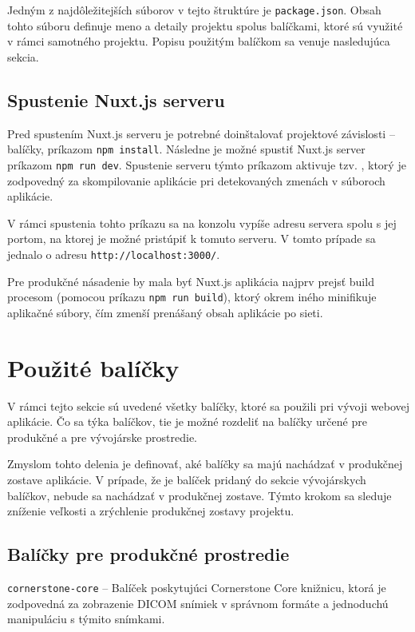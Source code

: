 Jedným z najdôležitejších súborov v tejto štruktúre je \texttt{package.json}. Obsah tohto súboru definuje meno a detaily projektu spolu\newline s balíčkami, ktoré sú využité v rámci samotného projektu. Popisu použitým balíčkom sa venuje nasledujúca sekcia.

\subsection {Spustenie Nuxt.js serveru}
Pred spustením Nuxt.js serveru je potrebné doinštalovať projektové závislosti -- balíčky, príkazom \texttt{npm install}. Následne je možné spustiť Nuxt.js server príkazom \texttt{npm run dev}. Spustenie serveru týmto príkazom aktivuje tzv. , ktorý je zodpovedný za skompilovanie aplikácie pri detekovaných zmenách v súboroch aplikácie.

\clearpage

V rámci spustenia tohto príkazu sa na konzolu vypíše adresu servera spolu s jej portom, na ktorej je možné pristúpiť k tomuto serveru. V tomto prípade sa jednalo o adresu \texttt{http://localhost:3000/}. 

Pre produkčné násadenie by mala byť Nuxt.js aplikácia najprv prejsť build procesom (pomocou príkazu \texttt{npm run build}), ktorý okrem iného minifikuje aplikačné súbory, čím zmenší prenášaný obsah aplikácie po sieti.

\section {Použité balíčky}
V rámci tejto sekcie sú uvedené všetky balíčky, ktoré sa použili pri vývoji webovej aplikácie.
Čo sa týka balíčkov, tie je možné rozdeliť na balíčky určené pre produkčné a pre vývojárske prostredie.

Zmyslom tohto delenia je definovať, aké balíčky sa majú nachádzať v produkčnej zostave aplikácie. V prípade, že je balíček pridaný do sekcie vývojárskych balíčkov, nebude sa nachádzať v produkčnej zostave. Týmto krokom sa sleduje zníženie veľkosti a zrýchlenie produkčnej zostavy projektu.

\subsection {Balíčky pre produkčné prostredie}
\texttt{cornerstone-core} -- Balíček poskytujúci Cornerstone Core knižnicu, ktorá je zodpovedná za zobrazenie DICOM snímiek v správnom formáte a jednoduchú manipuláciu s týmito snímkami.

